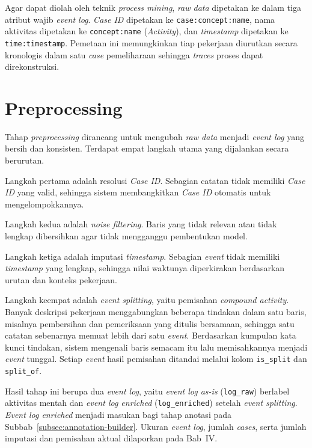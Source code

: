 Agar dapat diolah oleh teknik \textit{process mining}, \textit{raw data} dipetakan ke dalam tiga atribut wajib \textit{event log}. \textit{Case ID} dipetakan ke \texttt{case:concept:name}, nama aktivitas dipetakan ke \texttt{concept:name} (\textit{Activity}), dan \textit{timestamp} dipetakan ke \texttt{time:timestamp}. Pemetaan ini memungkinkan tiap pekerjaan diurutkan secara kronologis dalam satu \textit{case} pemeliharaan sehingga \textit{traces} proses dapat direkonstruksi.

\section{Preprocessing}

Tahap \textit{preprocessing} dirancang untuk mengubah \textit{raw data} menjadi \textit{event log} yang bersih dan konsisten. Terdapat empat langkah utama yang dijalankan secara berurutan.

Langkah pertama adalah resolusi \textit{Case ID}. Sebagian catatan tidak memiliki \textit{Case ID} yang valid, sehingga sistem membangkitkan \textit{Case ID} otomatis untuk mengelompokkannya.

Langkah kedua adalah \textit{noise filtering}. Baris yang tidak relevan atau tidak lengkap dibersihkan agar tidak mengganggu pembentukan model.

Langkah ketiga adalah imputasi \textit{timestamp}. Sebagian \textit{event} tidak memiliki \textit{timestamp} yang lengkap, sehingga nilai waktunya diperkirakan berdasarkan urutan dan konteks pekerjaan.

Langkah keempat adalah \textit{event splitting}, yaitu pemisahan \textit{compound activity}. Banyak deskripsi pekerjaan menggabungkan beberapa tindakan dalam satu baris, misalnya pembersihan dan pemeriksaan yang ditulis bersamaan, sehingga satu catatan sebenarnya memuat lebih dari satu \textit{event}. Berdasarkan kumpulan kata kunci tindakan, sistem mengenali baris semacam itu lalu memisahkannya menjadi \textit{event} tunggal. Setiap \textit{event} hasil pemisahan ditandai melalui kolom \texttt{is\_split} dan \texttt{split\_of}.

Hasil tahap ini berupa dua \textit{event log}, yaitu \textit{event log as-is} (\texttt{log\_raw}) berlabel aktivitas mentah dan \textit{event log enriched} (\texttt{log\_enriched}) setelah \textit{event splitting}. \textit{Event log enriched} menjadi masukan bagi tahap anotasi pada Subbab~\ref{subsec:annotation-builder}. Ukuran \textit{event log}, jumlah \textit{cases}, serta jumlah imputasi dan pemisahan aktual dilaporkan pada Bab~IV.

